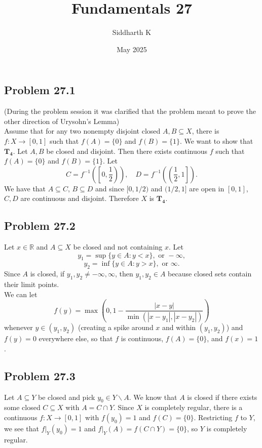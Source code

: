 \documentclass{article}
\title{Fundamentals 27}
\author{Siddharth K}
\date{May 2025}
\newcommand{\R}{\mathbb{R}}
\newcommand{\lb}{\left(}
\newcommand{\rb}{\right)}
\newcommand{\minus}{\backslash}
\begin{document}
\maketitle

\subsection*{Problem 27.1}
(During the problem session it was clarified that the problem meant to prove the other direction of Urysohn's Lemma) \\

Assume that for any two nonempty disjoint closed $A, B \subseteq X$, there is $f: X \to [0, 1]$ such that $f(A) = \{0\}$ and $f(B) = \{1\}$. We want to show that $\mathbf{T_4}$. Let $A, B$ be closed and disjoint. Then there exists continuous $f$ such that $f(A) = \{0\}$ and $f(B) = \{1\}$. Let
$$C = f^{-1}\lb\left[0, \frac{1}{2}\right)\rb, \quad D = f^{-1}\lb\left(\frac{1}{2}, 1\right]\rb.$$
We have that $A \subseteq C$, $B \subseteq D$ and since $[0, 1/2)$ and $(1/2, 1]$ are open in $[0, 1]$, $C, D$ are continuous and disjoint. Therefore $X$ is $\mathbf{T_4}$.

\subsection*{Problem 27.2}
Let $x \in \R$ and $A \subseteq X$ be closed and not containing $x$. Let
$$y_1 = \sup\{y \in A: y < x\}, \text{ or } -\infty,$$
$$y_2 = \inf\{y \in A: y > x\}, \text{ or } \infty.$$
Since $A$ is closed, if $y_1, y_2 \neq -\infty, \infty$, then $y_1, y_2 \in A$ because closed sets contain their limit points. \\

We can let
$$f(y) = \max\lb0, 1 - \frac{|x - y|}{\min(|x - y_1|, |x - y_2|)}\rb$$
whenever $y \in (y_1, y_2)$ (creating a spike around $x$ and within $(y_1, y_2)$) and $f(y) = 0$ everywhere else, so that $f$ is continuous, $f(A) = \{0\}$, and $f(x) = 1$.

\subsection*{Problem 27.3}
Let $A \subseteq Y$ be closed and pick $y_0 \in Y \minus A$. We know that $A$ is closed if there exists some closed $C \subseteq X$ with $A = C \cap Y$. Since $X$ is completely regular, there is a continuous $f: X \to [0, 1]$ with $f(y_0) = 1$ and $f(C) = \{0\}$. Restricting $f$ to $Y$, we see that $f|_Y(y_0) = 1$ and $f|_Y(A) = f(C \cap Y) = \{0\}$, so $Y$ is completely regular.
\end{document}
